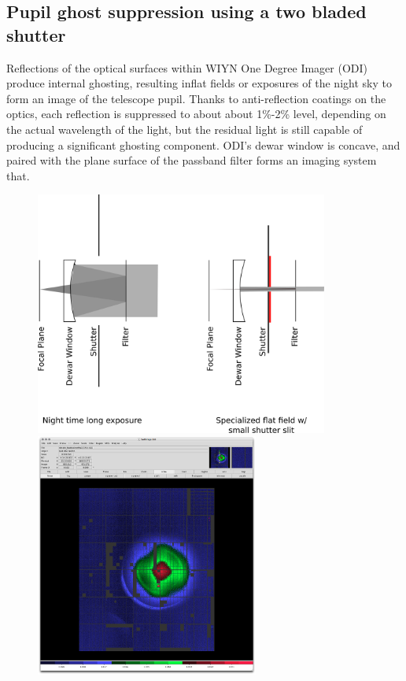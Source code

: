 \documentclass[]{spieman}
\begin{document}
\subsection{Pupil ghost suppression using a two bladed shutter}

Reflections of the optical surfaces within WIYN One Degree Imager (ODI) produce
internal ghosting, resulting inflat fields or exposures of the night sky to form
an image of the telescope pupil. Thanks to anti-reflection coatings on the
optics, each reflection is suppressed to about about 1\%-2\% level, depending on
the actual wavelength of the light, but the residual light is still capable of
producing a significant ghosting component. ODI’s dewar window is concave, and
paired with the plane surface of the passband filter forms an imaging system
that.

\begin{figure}
	\includegraphics[height=8cm]{images/odishutterpupilghostsupression.png}
	\hspace{0.5cm} \includegraphics[height=8cm]{images/odi_layeronepg.png}
	

\end{figure}
\end{document}
